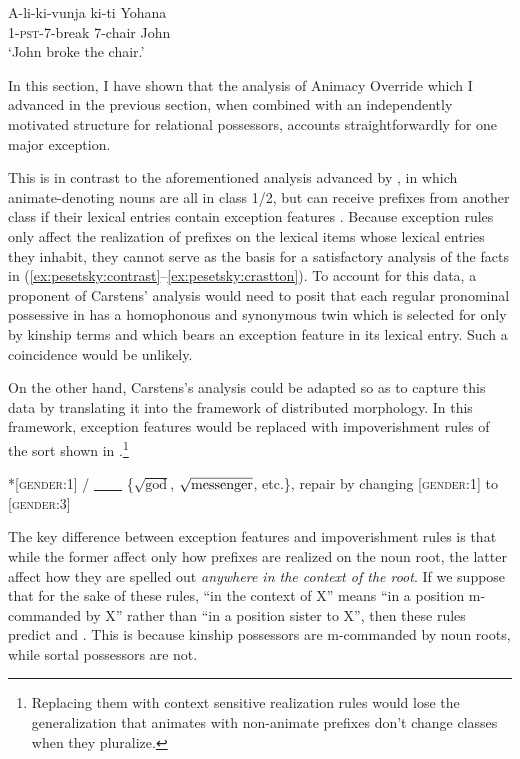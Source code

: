 \documentclass[output=paper,newtxmath,modfonts,nonflat,hidelinks]{langsci/langscibook}
\begin{document}
\ea\label{ex:pesetsky:realagreement}
{ \gll A-li-ki-vunja ki-ti Yohana \\
 \textsc{1}-\textsc{pst}-\textsc{7}-break \textsc{7}-chair John 
 \\ \glt `John broke the chair.' } \z 


In this section, I have shown that the analysis of Animacy Override which I advanced in the previous section, when combined with an independently motivated structure for relational possessors, accounts straightforwardly for one major exception.  

This is in contrast to the aforementioned analysis advanced by \citet{carstens91}, in which animate-denoting nouns are all in class 1/2, but can receive prefixes from another class if their lexical entries contain exception features .  Because exception rules only affect the realization of prefixes on the lexical items whose lexical entries they inhabit, they cannot serve as the basis for a satisfactory analysis of the facts in (\ref{ex:pesetsky:contrast}–\ref{ex:pesetsky:crastton}).  To account for this data, a proponent of Carstens' analysis would need to posit that each regular pronominal possessive in  has a homophonous and synonymous twin which is selected for only by kinship terms and which bears an exception feature in its lexical entry.  Such a coincidence would be unlikely. 

On the other hand, Carstens's analysis could be adapted so as to capture this data by translating it into the framework of distributed morphology.  In this framework, exception features would be replaced with impoverishment rules of the sort shown in .\footnote{Replacing them with context sensitive realization rules would lose the generalization that animates with non-animate prefixes don't change classes when they pluralize. }

\ea\label{ex:pesetsky:impoverishment}{ 
*[\textsc{gender}:1] / 
\ul{~~~~} 
\{$\sqrt{\text{god}}$, $\sqrt{\text{messenger\vphantom{d}}}$, etc.\}, 
repair by changing [\textsc{gender}:1] to [\textsc{gender}:3]} \z

The key difference between exception features and impoverishment rules is that while the former affect only how  prefixes are realized on the noun root, the latter affect how they are spelled out \textit{anywhere in the context of the root}. If we suppose that for the sake of these rules, ``in the context of X'' means ``in a position m-commanded by X'' rather than ``in a position sister to X'', then these rules predict  and .  This is because kinship possessors are m-commanded by noun roots, while sortal possessors are not. 
\end{document}
